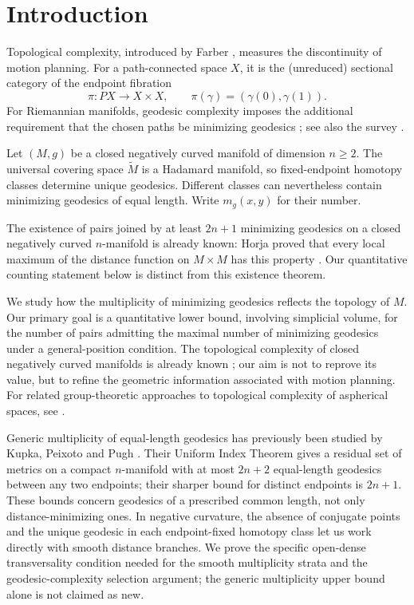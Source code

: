 \section{Introduction}

Topological complexity, introduced by Farber \cite{Farber2003}, measures the discontinuity of motion planning.
For a path-connected space $X$, it is the (unreduced) sectional
category of the endpoint fibration
\[
 \pi:PX\longrightarrow X\times X,\qquad
 \pi(\gamma)=(\gamma(0),\gamma(1)).
\]
For Riemannian manifolds, geodesic complexity imposes the additional
requirement that the chosen paths be minimizing geodesics
\cite{RecioMitter2021,MescherStegemeyer2023,MescherStegemeyerHomogeneous2023}; see also the survey
\cite{Mescher2024}.

Let $(M,g)$ be a closed negatively curved manifold of dimension
$n\geq 2$. The universal covering space $\widetilde M$ is a Hadamard
manifold, so fixed-endpoint homotopy classes determine unique geodesics.
Different classes can nevertheless contain minimizing geodesics of
equal length. Write $m_g(x,y)$ for their number.

The existence of pairs joined by at least $2n+1$ minimizing
geodesics on a closed negatively curved $n$-manifold is already
known: Horja proved that every local maximum of the distance
function on $M\times M$ has this property
\cite{Horja1997}. Our quantitative counting statement below
is distinct from this existence theorem.

We study how the multiplicity of minimizing geodesics reflects the
topology of $M$. Our primary goal is a quantitative lower bound,
involving simplicial volume, for the number of pairs admitting the
maximal number of minimizing geodesics under a general-position
condition. The topological complexity of closed negatively curved
manifolds is already known \cite{Dranishnikov2020}; our aim is not to reprove its value, but
to refine the geometric information associated with motion planning.
For related group-theoretic approaches to topological complexity of
aspherical spaces, see \cite{GrantLuptonOprea2015,FarberMescher2020,FarberGrantLuptonOprea2019,FarberOprea2019}.

Generic multiplicity of equal-length geodesics has previously
been studied by Kupka, Peixoto and Pugh
\cite{KupkaPeixotoPugh2006}.
Their Uniform Index Theorem gives a residual set of
metrics on a compact $n$-manifold with at most $2n+2$
equal-length geodesics between any two endpoints;
their sharper bound for distinct endpoints is $2n+1$.
These bounds concern geodesics of a prescribed common
length, not only distance-minimizing ones.
In negative curvature, the absence of conjugate points
and the unique geodesic in each endpoint-fixed homotopy
class let us work directly with smooth distance branches.
We prove the specific open-dense transversality condition
needed for the smooth multiplicity strata and the
geodesic-complexity selection argument; the
generic multiplicity upper bound alone is not claimed
as new.

